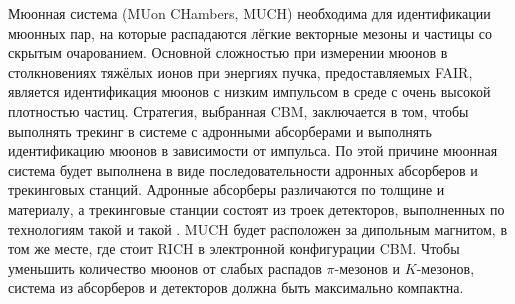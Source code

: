 \begin{minipage}[b]{0.495\textwidth}
Мюонная система (MUon CHambers, MUCH) необходима для идентификации мюонных пар, на которые распадаются лёгкие векторные мезоны и частицы со скрытым очарованием.
Основной сложностью при измерении мюонов в столкновениях тяжёлых ионов при энергиях пучка, предоставляемых FAIR, является идентификация мюонов с низким импульсом в среде с очень высокой плотностью частиц. Стратегия, выбранная CBM, заключается в том, чтобы выполнять трекинг в системе с адронными абсорберами и выполнять идентификацию мюонов в зависимости от импульса. По этой причине мюонная система будет выполнена в виде последовательности адронных абсорберов и трекинговых станций. Адронные абсорберы различаются по толщине и материалу, а трекинговые станции состоят из троек детекторов, выполненных по технологиям \todo такой и такой \todo. MUCH будет расположен за дипольным магнитом, в том же месте, где стоит RICH в электронной конфигурации CBM. Чтобы уменьшить количество мюонов от слабых распадов $\pi$-мезонов и $K$-мезонов, система из абсорберов и детекторов должна быть максимально компактна.
\end{minipage}
